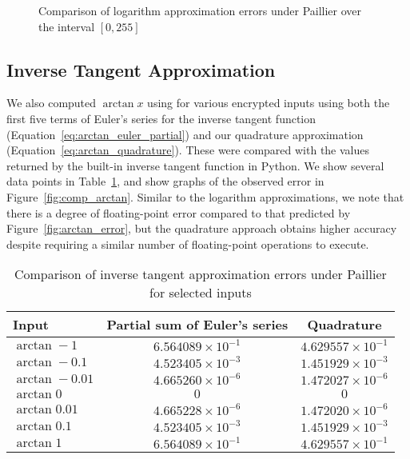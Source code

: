 \begin{figure}[!ht]
	\centering
	\caption{Comparison of logarithm approximation errors under Paillier over the interval $[0, 255]$}
	\label{fig:comp_log}
\end{figure}

\subsection{Inverse Tangent Approximation}
We also computed $\arctan x$ using for various encrypted inputs using both the first five terms of Euler's series for the inverse tangent function (Equation~\ref{eq:arctan_euler_partial}) and our quadrature approximation (Equation~\ref{eq:arctan_quadrature}). These were compared with the values returned by the built-in inverse tangent function in Python. We show several data points in Table~\ref{tab:arctan_approximation}, and show graphs of the observed error in Figure~\ref{fig:comp_arctan}. Similar to the logarithm approximations, we note that there is a degree of floating-point error compared to that predicted by Figure~\ref{fig:arctan_error}, but the quadrature approach obtains higher accuracy despite requiring a similar number of floating-point operations to execute.

\begin{table}[ht]
	\caption{Comparison of inverse tangent approximation errors under Paillier for selected inputs}
	\label{tab:arctan_approximation}
	\begin{tabular}{lcc}
		\toprule
		Input & Partial sum of Euler's series & Quadrature\\
		\midrule
		$\arctan -1$ & $6.564089 \times 10^{-1}$ & $4.629557 \times 10^{-1}$\\
		$\arctan -0.1$ & $4.523405 \times 10^{-3}$ & $1.451929 \times 10^{-3}$\\
		$\arctan -0.01$ & $4.665260 \times 10^{-6}$ & $1.472027 \times 10^{-6}$\\
		$\arctan 0$ & $0$ & $0$\\
		$\arctan 0.01$ & $4.665228 \times 10^{-6}$ & $1.472020 \times 10^{-6}$\\
		$\arctan 0.1$ & $4.523405 \times 10^{-3} $ & $1.451929 \times 10^{-3}$\\
		$\arctan 1$ & $6.564089 \times 10^{-1} $ & $4.629557 \times 10^{-1}$\\
	\bottomrule
\end{tabular}
\end{table}

